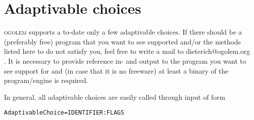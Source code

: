 \documentclass[a4paper,10pt]{scrbook}
\newcommand{\ogo}{\textsc{ogolem}}
\begin{document}
\begin{itemize}
  
\end{itemize}

\section{Adaptivable choices}
\ogo{} supports a to-date only a few adaptivable choices. If there should be a
(preferably free) program that you want to see supported and/or the methods
listed here to do not satisfy you, feel free to write a mail to
dieterich@ogolem.org . It is necessary to provide reference in- and output to
the program you want to see support for and (in case that it is no freeware) at
least a binary of the program/engine is required.

In general, all adaptivable choices are easily called through input of form
\begin{verbatim}
AdaptivableChoice=IDENTIFIER:FLAGS
\end{verbatim}
\end{document}
